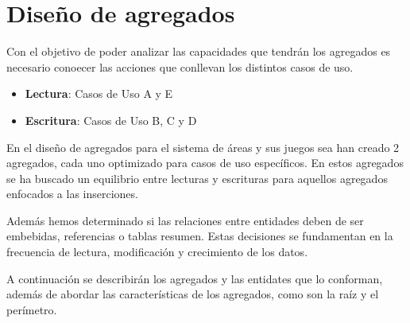 \documentclass[]{article}
\begin{document}
\section{Diseño de agregados}
\label{sec:agregados}
Con el objetivo de poder analizar las capacidades que tendrán los agregados es necesario conoecer las acciones que conllevan los distintos casos de uso.
\begin{itemize}
    \item \textbf{Lectura}: Casos de Uso A y E
    \item \textbf{Escritura}: Casos de Uso B, C y D
\end{itemize}

En el diseño de agregados para el sistema de áreas y sus juegos sea han creado 2 agregados, cada uno optimizado para casos de uso específicos. En estos agregados se ha buscado un equilibrio entre lecturas y escrituras para aquellos agregados enfocados a las inserciones.

Además hemos determinado si las relaciones entre entidades deben de ser embebidas, referencias o tablas resumen. Estas decisiones se fundamentan en la frecuencia de lectura, modificación y crecimiento de los datos.

A continuación se describirán los agregados y las entidates que lo conforman, además de abordar las características de los agregados, como son la raíz y el perímetro.
\end{document}
